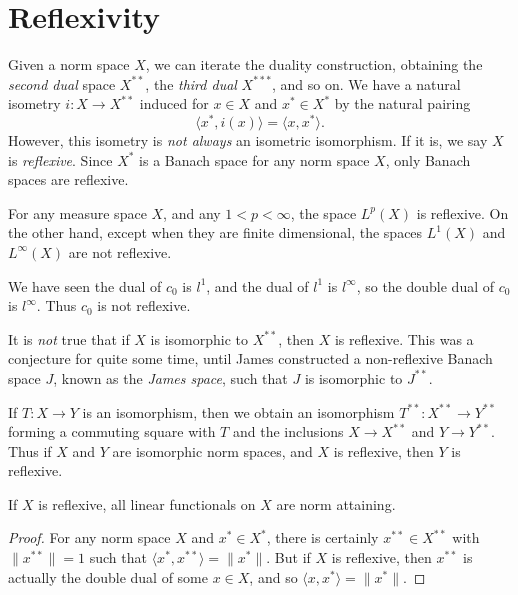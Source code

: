 \section{Reflexivity}

Given a norm space $X$, we can iterate the duality construction, obtaining the \emph{second dual} space $X^{**}$, the \emph{third dual} $X^{***}$, and so on. We have a natural isometry $i: X \to X^{**}$ induced for $x \in X$ and $x^* \in X^*$ by the natural pairing
%
\[ \langle x^*, i(x) \rangle = \langle x, x^* \rangle. \]
%
However, this isometry is \emph{not always} an isometric isomorphism. If it is, we say $X$ is \emph{reflexive}. Since $X^*$ is a Banach space for any norm space $X$, only Banach spaces are reflexive.

\begin{example}
    For any measure space $X$, and any $1 < p < \infty$, the space $L^p(X)$ is reflexive. On the other hand, except when they are finite dimensional, the spaces $L^1(X)$ and $L^\infty(X)$ are not reflexive.
\end{example}

\begin{example}
    We have seen the dual of $c_0$ is $l^1$, and the dual of $l^1$ is $l^\infty$, so the double dual of $c_0$ is $l^\infty$. Thus $c_0$ is not reflexive.
\end{example}

\begin{remark}
    It is \emph{not} true that if $X$ is isomorphic to $X^{**}$, then $X$ is reflexive. This was a conjecture for quite some time, until James constructed a non-reflexive Banach space $J$, known as the \emph{James space}, such that $J$ is isomorphic to $J^{**}$.
\end{remark}

If $T: X \to Y$ is an isomorphism, then we obtain an isomorphism $T^{**}: X^{**} \to Y^{**}$ forming a commuting square with $T$ and the inclusions $X \to X^{**}$ and $Y \to Y^{**}$. Thus if $X$ and $Y$ are isomorphic norm spaces, and $X$ is reflexive, then $Y$ is reflexive.

\begin{theorem}
    If $X$ is reflexive, all linear functionals on $X$ are norm attaining.
\end{theorem}
\begin{proof}
    For any norm space $X$ and $x^* \in X^*$, there is certainly $x^{**} \in X^{**}$ with $\| x^{**} \| = 1$ such that $\langle x^*, x^{**} \rangle = \| x^* \|$. But if $X$ is reflexive, then $x^{**}$ is actually the double dual of some $x \in X$, and so $\langle x, x^* \rangle = \| x^* \|$.
\end{proof}

